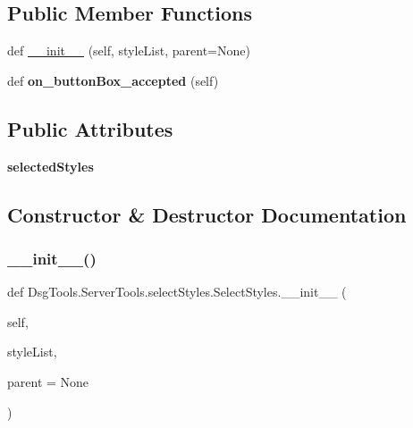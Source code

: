 \subsection*{Public Member Functions}
\begin{DoxyCompactItemize}
\item 
def \mbox{\hyperlink{class_dsg_tools_1_1_server_tools_1_1select_styles_1_1_select_styles_aa1a95bdbcd33b3491a1758b4cdbd6611}{\+\_\+\+\_\+init\+\_\+\+\_\+}} (self, style\+List, parent=None)
\item 
\mbox{\label{class_dsg_tools_1_1_server_tools_1_1select_styles_1_1_select_styles_a580cced48d2f0bfeb0023e0a2b2c2296}} 
def {\bfseries on\+\_\+button\+Box\+\_\+accepted} (self)
\end{DoxyCompactItemize}
\subsection*{Public Attributes}
\begin{DoxyCompactItemize}
\item 
\mbox{\label{class_dsg_tools_1_1_server_tools_1_1select_styles_1_1_select_styles_a4e5e5d517b33b9835e596532d5dd1f10}} 
{\bfseries selected\+Styles}
\end{DoxyCompactItemize}


\subsection{Constructor \& Destructor Documentation}
\mbox{\label{class_dsg_tools_1_1_server_tools_1_1select_styles_1_1_select_styles_aa1a95bdbcd33b3491a1758b4cdbd6611}} 
\subsubsection{\texorpdfstring{\+\_\+\+\_\+init\+\_\+\+\_\+()}{\_\_init\_\_()}}
{\footnotesize\ttfamily def Dsg\+Tools.\+Server\+Tools.\+select\+Styles.\+Select\+Styles.\+\_\+\+\_\+init\+\_\+\+\_\+ (\begin{DoxyParamCaption}\item[{}]{self,  }\item[{}]{style\+List,  }\item[{}]{parent = {\ttfamily None} }\end{DoxyParamCaption})}

